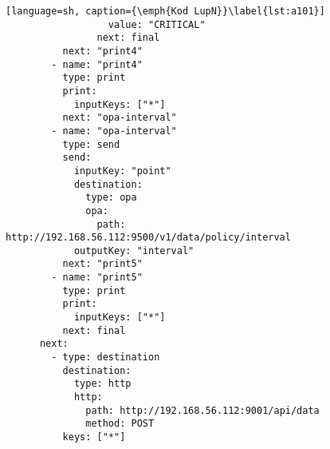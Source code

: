 \begin{lstlisting}[language=sh, caption={\emph{Kod LupN}}\label{lst:a101}]
                  value: "CRITICAL"
                next: final
          next: "print4"
        - name: "print4"
          type: print
          print:
            inputKeys: ["*"]
          next: "opa-interval"
        - name: "opa-interval"
          type: send
          send: 
            inputKey: "point"
            destination: 
              type: opa
              opa: 
                path: http://192.168.56.112:9500/v1/data/policy/interval
            outputKey: "interval"
          next: "print5"
        - name: "print5"
          type: print
          print:
            inputKeys: ["*"]
          next: final
      next: 
        - type: destination
          destination: 
            type: http
            http: 
              path: http://192.168.56.112:9001/api/data
              method: POST
          keys: ["*"]
\end{lstlisting}
